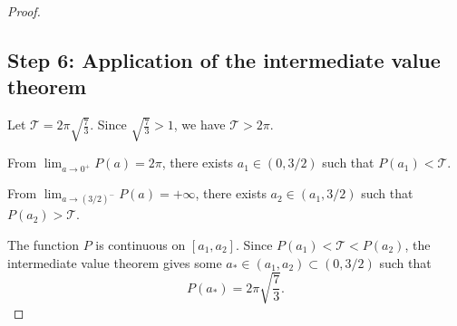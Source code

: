 \begin{proof}
\subsection*{Step 6: Application of the intermediate value theorem}

Let $\mathcal{T} = 2\pi\sqrt{\frac{7}{3}}$. Since $\sqrt{\frac{7}{3}} > 1$, we have $\mathcal{T} > 2\pi$.

From $\lim_{a \to 0^+} P(a) = 2\pi$, there exists $a_1 \in (0, 3/2)$ such that $P(a_1) < \mathcal{T}$.

From $\lim_{a \to (3/2)^-} P(a) = +\infty$, there exists $a_2 \in (a_1, 3/2)$ such that $P(a_2) > \mathcal{T}$.

The function $P$ is continuous on $[a_1, a_2]$. Since $P(a_1) < \mathcal{T} < P(a_2)$, the intermediate value theorem gives some $a_* \in (a_1, a_2) \subset (0, 3/2)$ such that
\[
P(a_*) = 2\pi\sqrt{\frac{7}{3}}.
\]
\end{proof}
